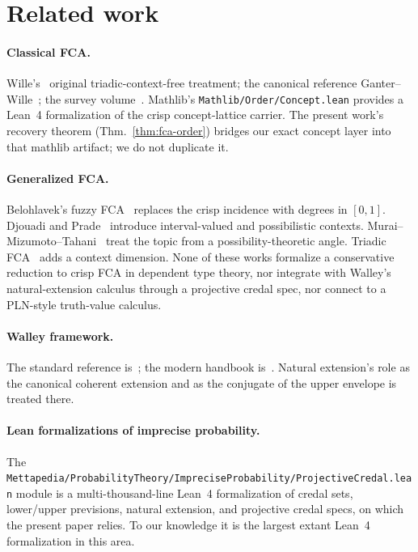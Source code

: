 \documentclass[]{article}
\newcommand{\lpath}[1]{\texttt{\nolinkurl{#1}}}
\begin{document}
\section{Related work}\label{sec:related}

\paragraph{Classical FCA.} Wille's~\cite{wille1982} original triadic-context-free
treatment; the canonical reference Ganter--Wille~\cite{gantnerwille1999}; the
survey volume~\cite{gantnerstumemwille2005}. Mathlib's
\lpath{Mathlib/Order/Concept.lean} provides a Lean~4 formalization of the
crisp concept-lattice carrier. The present work's recovery theorem
(Thm.~\ref{thm:fca-order}) bridges our exact concept layer into that mathlib
artifact; we do not duplicate it.

\paragraph{Generalized FCA.} Belohlavek's fuzzy FCA~\cite{belohlavek1999}
replaces the crisp incidence with degrees in $[0,1]$. Djouadi and
Prade~\cite{djouadi2009} introduce interval-valued and possibilistic contexts.
Murai--Mizumoto--Tahani~\cite{murai1989} treat the topic from a possibility-theoretic
angle. Triadic FCA~\cite{wille1995} adds a context dimension. None of these works
formalize a conservative reduction to crisp FCA in dependent type theory, nor
integrate with Walley's natural-extension calculus through a projective credal
spec, nor connect to a PLN-style truth-value calculus.

\paragraph{Walley framework.} The standard reference is~\cite{walley1991}; the
modern handbook is~\cite{augustin2014}. Natural extension's role as the canonical
coherent extension and as the conjugate of the upper envelope is treated there.

\paragraph{Lean formalizations of imprecise probability.} The
\lpath{Mettapedia/ProbabilityTheory/ImpreciseProbability/ProjectiveCredal.lean}
module is a multi-thousand-line Lean~4 formalization of credal sets, lower/upper
previsions, natural extension, and projective credal specs, on which the present
paper relies. To our knowledge it is the largest extant Lean~4 formalization in
this area.
\end{document}
